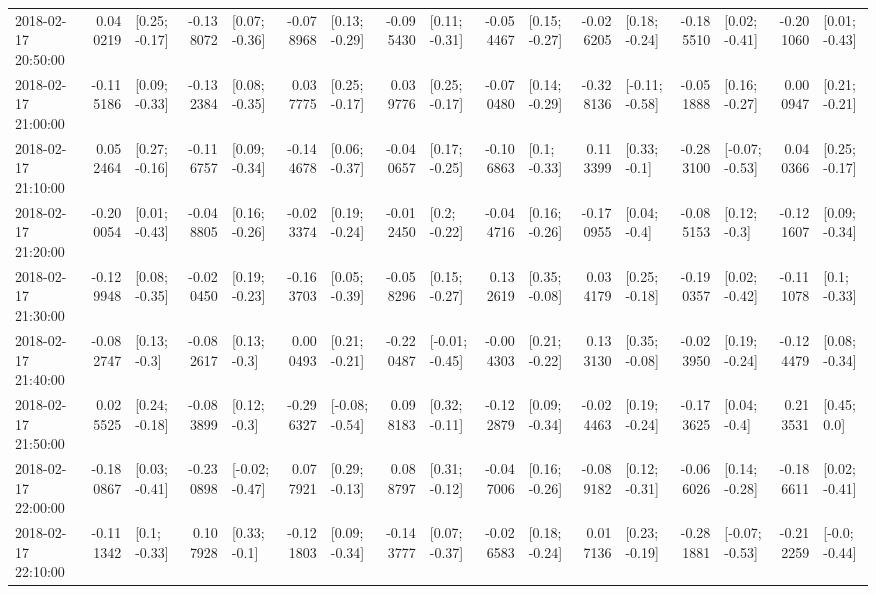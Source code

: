 \begin{tabular}{lrlrlrlrlrlrlrlrl}
2018-02-17 20:50:00 &  0.040219 &   [0.25; -0.17] & -0.138072 &   [0.07; -0.36] & -0.078968 &   [0.13; -0.29] & -0.095430 &   [0.11; -0.31] & -0.054467 &   [0.15; -0.27] & -0.026205 &   [0.18; -0.24] & -0.185510 &   [0.02; -0.41] & -0.201060 &   [0.01; -0.43] \\
2018-02-17 21:00:00 & -0.115186 &   [0.09; -0.33] & -0.132384 &   [0.08; -0.35] &  0.037775 &   [0.25; -0.17] &  0.039776 &   [0.25; -0.17] & -0.070480 &   [0.14; -0.29] & -0.328136 &  [-0.11; -0.58] & -0.051888 &   [0.16; -0.27] &  0.000947 &   [0.21; -0.21] \\
2018-02-17 21:10:00 &  0.052464 &   [0.27; -0.16] & -0.116757 &   [0.09; -0.34] & -0.144678 &   [0.06; -0.37] & -0.040657 &   [0.17; -0.25] & -0.106863 &    [0.1; -0.33] &  0.113399 &    [0.33; -0.1] & -0.283100 &  [-0.07; -0.53] &  0.040366 &   [0.25; -0.17] \\
2018-02-17 21:20:00 & -0.200054 &   [0.01; -0.43] & -0.048805 &   [0.16; -0.26] & -0.023374 &   [0.19; -0.24] & -0.012450 &    [0.2; -0.22] & -0.044716 &   [0.16; -0.26] & -0.170955 &    [0.04; -0.4] & -0.085153 &    [0.12; -0.3] & -0.121607 &   [0.09; -0.34] \\
2018-02-17 21:30:00 & -0.129948 &   [0.08; -0.35] & -0.020450 &   [0.19; -0.23] & -0.163703 &   [0.05; -0.39] & -0.058296 &   [0.15; -0.27] &  0.132619 &   [0.35; -0.08] &  0.034179 &   [0.25; -0.18] & -0.190357 &   [0.02; -0.42] & -0.111078 &    [0.1; -0.33] \\
2018-02-17 21:40:00 & -0.082747 &    [0.13; -0.3] & -0.082617 &    [0.13; -0.3] &  0.000493 &   [0.21; -0.21] & -0.220487 &  [-0.01; -0.45] & -0.004303 &   [0.21; -0.22] &  0.133130 &   [0.35; -0.08] & -0.023950 &   [0.19; -0.24] & -0.124479 &   [0.08; -0.34] \\
2018-02-17 21:50:00 &  0.025525 &   [0.24; -0.18] & -0.083899 &    [0.12; -0.3] & -0.296327 &  [-0.08; -0.54] &  0.098183 &   [0.32; -0.11] & -0.122879 &   [0.09; -0.34] & -0.024463 &   [0.19; -0.24] & -0.173625 &    [0.04; -0.4] &  0.213531 &     [0.45; 0.0] \\
2018-02-17 22:00:00 & -0.180867 &   [0.03; -0.41] & -0.230898 &  [-0.02; -0.47] &  0.077921 &   [0.29; -0.13] &  0.088797 &   [0.31; -0.12] & -0.047006 &   [0.16; -0.26] & -0.089182 &   [0.12; -0.31] & -0.066026 &   [0.14; -0.28] & -0.186611 &   [0.02; -0.41] \\
2018-02-17 22:10:00 & -0.111342 &    [0.1; -0.33] &  0.107928 &    [0.33; -0.1] & -0.121803 &   [0.09; -0.34] & -0.143777 &   [0.07; -0.37] & -0.026583 &   [0.18; -0.24] &  0.017136 &   [0.23; -0.19] & -0.281881 &  [-0.07; -0.53] & -0.212259 &   [-0.0; -0.44] \\

\end{tabular}
